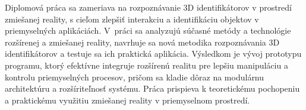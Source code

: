 Diplomová práca sa zameriava na rozpoznávanie 3D identifikátorov v prostredí zmiešanej reality, s cieľom zlepšiť interakciu a identifikáciu objektov v priemyselných aplikáciách. V~práci sa analyzujú súčasné metódy a technológie rozšírenej a zmiešanej reality, navrhuje sa nová metodika rozpoznávania 3D identifikátorov a testuje sa ich praktická aplikácia. Výsledkom je vývoj prototypu programu, ktorý efektívne integruje rozšírenú realitu pre lepšiu manipuláciu a kontrolu priemyselných procesov, pričom sa kladie dôraz na modulárnu architektúru a rozšíriteľnosť systému. Práca prispieva k teoretickému pochopeniu a praktickému využitiu zmiešanej reality v priemyselnom prostredí.